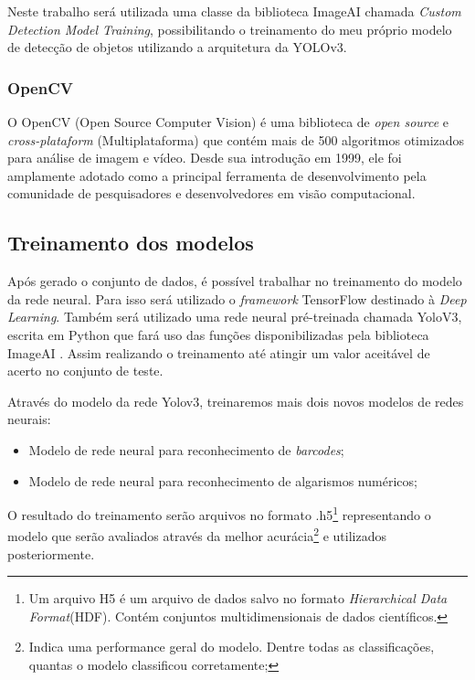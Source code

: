 Neste trabalho será utilizada uma classe da biblioteca ImageAI chamada \textit{Custom Detection Model Training}, possibilitando o treinamento do meu próprio modelo de detecção de objetos utilizando a arquitetura da YOLOv3.


\subsubsection{OpenCV}

O OpenCV (Open Source Computer Vision) é uma biblioteca de \textit{open source} e \textit{cross-plataform} (Multiplataforma) que contém mais de 500 algoritmos otimizados para análise de imagem e vídeo. Desde sua introdução em 1999, ele foi amplamente adotado como a principal ferramenta de desenvolvimento pela comunidade de pesquisadores e desenvolvedores em visão computacional.\cite{opencv}


\subsection{Treinamento dos modelos}

Após gerado o conjunto de dados, é possível trabalhar no treinamento do modelo da rede neural. Para isso será utilizado o \textit{framework} TensorFlow destinado à \textit{Deep Learning}. Também será utilizado uma rede neural pré-treinada chamada YoloV3, escrita em Python que fará uso das funções disponibilizadas pela biblioteca ImageAI . Assim realizando o treinamento até atingir um valor aceitável de acerto no conjunto de teste. 

Através do modelo da rede Yolov3, treinaremos mais dois novos modelos de redes neurais:
\begin{itemize}
    \item Modelo de rede neural para reconhecimento de \textit{barcodes};
    \item Modelo de rede neural para reconhecimento de algarismos numéricos;
\end{itemize}

O resultado do treinamento serão arquivos no formato .h5\footnote{Um arquivo H5 é um arquivo de dados salvo no formato \textit{Hierarchical Data Format}(HDF). Contém conjuntos multidimensionais de dados científicos.} representando o modelo que serão avaliados através da melhor acurácia\footnote{Indica uma performance geral do modelo. Dentre todas as classificações, quantas o modelo classificou corretamente;} e utilizados posteriormente.

